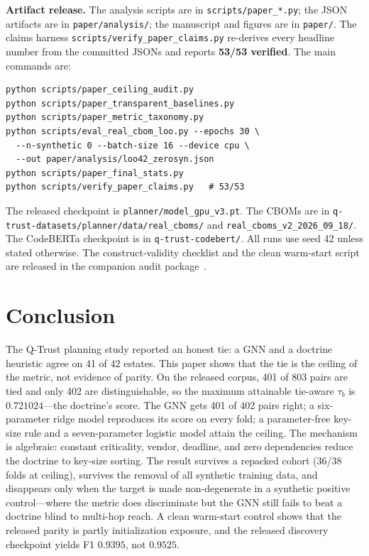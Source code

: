 \documentclass[conference,10pt]{IEEEtran}
\newcommand{\tb}{\tau_b}
\begin{document}
\textbf{Artifact release.} The analysis scripts are in \texttt{scripts/paper\_*.py}; the JSON
artifacts are in \texttt{paper/analysis/}; the manuscript and figures are in \texttt{paper/}. The
claims harness \texttt{scripts/verify\_paper\_claims.py} re-derives every headline number from
the committed JSONs and reports \textbf{53/53 verified}. The main commands are:
\begin{verbatim}
python scripts/paper_ceiling_audit.py
python scripts/paper_transparent_baselines.py
python scripts/paper_metric_taxonomy.py
python scripts/eval_real_cbom_loo.py --epochs 30 \
  --n-synthetic 0 --batch-size 16 --device cpu \
  --out paper/analysis/loo42_zerosyn.json
python scripts/paper_final_stats.py
python scripts/verify_paper_claims.py   # 53/53
\end{verbatim}
The released checkpoint is \texttt{planner/model\_gpu\_v3.pt}. The CBOMs are in
\texttt{q-trust-datasets/planner/data/real\_cboms/} and
\texttt{real\_cboms\_v2\_2026\_09\_18/}. The CodeBERTa checkpoint is in
\texttt{q-trust-codebert/}. All runs use seed 42 unless stated otherwise. The construct-validity
checklist and the clean warm-start script are released in the companion audit
package~\cite{qtrust_validity_audit}.

\section{Conclusion}

The Q-Trust planning study reported an honest tie: a GNN and a doctrine heuristic agree on 41 of
42 estates. This paper shows that the tie is the ceiling of the metric, not evidence of parity.
On the released corpus, 401 of 803 pairs are tied and only 402 are distinguishable, so the
maximum attainable tie-aware $\tb$ is $0.721024$---the doctrine's score. The GNN gets 401 of 402
pairs right; a six-parameter ridge model reproduces its score on every fold; a parameter-free
key-size rule and a seven-parameter logistic model attain the ceiling. The mechanism is
algebraic: constant criticality, vendor, deadline, and zero dependencies reduce the doctrine to
key-size sorting. The result survives a repacked cohort (36/38 folds at ceiling), survives the
removal of all synthetic training data, and disappears only when the target is made
non-degenerate in a synthetic positive control---where the metric does discriminate but the GNN
still fails to beat a doctrine blind to multi-hop reach. A clean warm-start control shows that
the released parity is partly initialization exposure, and the released discovery checkpoint
yields F1 $0.9395$, not $0.9525$.
\end{document}
